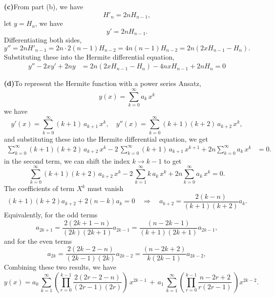 \documentclass[12pt]{article}
\begin{document}
\pagebreak
\noindent\textbf{(c)}\quad From part (b), we have
\begin{equation}
    H'_n = 2nH_{n-1},
\end{equation}
let $y = H_n$, we have
\begin{equation}
    y' = 2n H_{n-1}.
\end{equation}
Differentiating both sides, 
\begin{equation}
    y'' = 2n H'_{n-1} = 2n \cdot 2(n-1) H_{n-2} = 4n(n-1) H_{n-2} = 2n(2xH_{n-1} - H_n).
\end{equation}
Substituting these into the Hermite differential equation,
\begin{equation}
\begin{aligned}
  y'' - 2xy' + 2ny &= 2n(2xH_{n-1}-H_n) - 4nxH_{n-1} + 2nH_n = 0
\end{aligned}
\end{equation}

\noindent\textbf{(d)}\quad To represent the Hermite function with a power series Ansatz,
\begin{equation}
    y(x) = \sum_{k=0}^{\infty}a_k \, x^k
\end{equation} 
we have
\begin{equation}
    y'(x) = \sum_{k=0}^{\infty} (k+1)\,a_{k+1}\,x^{k}, \quad y''(x) = \sum_{k=0}^{\infty} (k+1)(k+2)\,a_{k+2}\,x^k,
\end{equation}
and substituting these into the Hermite differential equation, we get
\begin{equation}
\begin{aligned}
    \sum_{k=0}^{\infty} (k+1)(k+2)\,a_{k+2}\,x^k - 2\,\sum_{k=0}^{\infty} (k+1)\,a_{k+1}\,x^{k+1} + 2n \sum_{k=0}^{\infty} a_k \, x^k &= 0.
\end{aligned}
\end{equation}
in the second term, we can shift the index $k \to k-1$ to get
\begin{equation}
    \sum_{k=0}^{\infty} (k+1)(k+2)\,a_{k+2}\,x^k - 2\,\sum_{k=1}^{\infty} k\,a_{k}\,x^{k} + 2n \sum_{k=0}^{\infty} a_k \, x^k = 0.
\end{equation}
The coefficients of term $X^k$ must vanish
\begin{equation}
    (k+1)(k+2)a_{k+2}+2(n-k)a_k = 0 \quad \Rightarrow \quad a_{k+2} = \frac{2(k-n)}{(k+1)(k+2)} a_k.
\end{equation}
Equivalently, for the odd terms
\begin{equation}
    a_{2k+1} = \frac{2(2k+1-n)}{(2k)(2k+1)} a_{2k-1} = \frac{(n-2k-1)}{(k+1)(2k+1)} a_{2k-1},
\end{equation}
and for the even terms
\begin{equation}
    a_{2k} = \frac{2(2k-2-n)}{(2k-1)(2k)} a_{2k-2} = \frac{(n-2k+2)}{k(2k-1)} a_{2k-2},
\end{equation}
Combining these two results, we have
\begin{equation}
    y(x) = a_0 \, \sum_{k=1}^{\infty} \left(\prod_{r=0}^{k-1} \frac{2(2r-2-n)}{(2r-1)(2r)}\right)\,x^{2k-1} \, + \, 
    a_1\, \sum_{k=1}^{\infty} \left(\prod_{r=0}^{k-1} \frac{n-2r+2}{r(2r-1)}\,\right) x^{2k-2}.
\end{equation}
\end{document}
